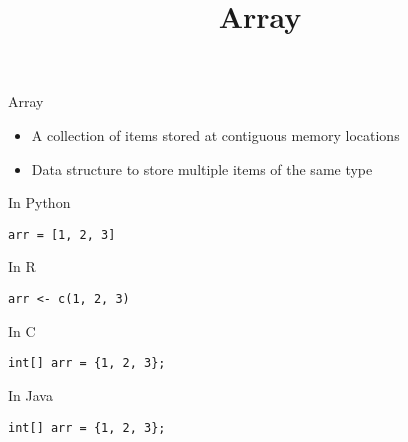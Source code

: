 \documentclass{beamer}
\title{Array}
\begin{document}
\frame{
  \titlepage
}

\begin{frame}[fragile]{Array}
  
  \begin{block}{}
    \begin{itemize}
      \item A collection of items stored at contiguous memory locations
      \item Data structure to store multiple items of the same type
    \end{itemize}
  \end{block}
  
  \begin{block}{}
    \centering
  \end{block}
  
  \begin{minipage}{0.48\textwidth}
    \begin{code}{In Python}
      \begin{lstlisting}[style=codePy]
arr = [1, 2, 3]
      \end{lstlisting}
    \end{code}
    
    \begin{code}{In R}
      \begin{lstlisting}[style=codeR]
arr <- c(1, 2, 3)
      \end{lstlisting}
    \end{code}
  
  \end{minipage}\hfill
  \begin{minipage}{0.48\textwidth}
    \begin{code}{In C}
      \begin{lstlisting}[style=codeC]
int[] arr = {1, 2, 3};
      \end{lstlisting}
    \end{code}
  
    \begin{code}{In Java}
      \begin{lstlisting}[style=codeJ]
int[] arr = {1, 2, 3};
      \end{lstlisting}
    \end{code}
  \end{minipage}
\end{frame}
\end{document}
